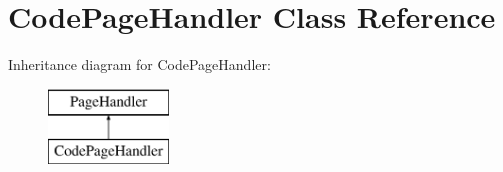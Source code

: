 \hypertarget{classCodePageHandler}{\section{Code\-Page\-Handler Class Reference}
\label{classCodePageHandler}
}
Inheritance diagram for Code\-Page\-Handler\-:\begin{figure}[H]
\begin{center}
\leavevmode
\includegraphics[height=2.000000cm]{classCodePageHandler}
\end{center}
\end{figure}
